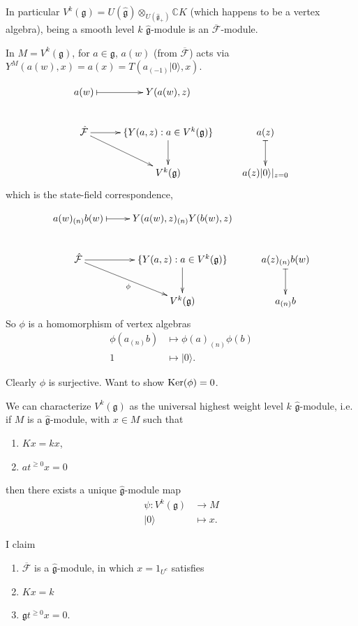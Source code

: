 \medskip\noindent
In particular
$V^k(\mathfrak{g})
=U(\hat{\mathfrak{g}})
\otimes_{U(\hat{\mathfrak{g}}_+)}\mathbb{C}K$
(which happens to be a vertex algebra),
being a smooth level $k$
$\hat{\mathfrak{g}}$-module is an
$\overline{\mathcal{F}}$-module.

In $M=V^k(\mathfrak{g})$, for $a \in
\mathfrak{g}$,
$a(w)$ (from $\overline{\mathcal{F}}$) acts
via
$Y^M(a(w),x)=a(x)=T(a_{(-1)}|0\rangle,x)$.

$$
\xymatrix{
a(w)\ar@{|->}[r]&Y(a(w),z)\\
\hat{\mathcal{F}}\ar[r]\ar[rd]& \{Y(a,z):a
\in V^k(\mathfrak{g})\}
\ar[d]
& a(z)\ar@{|->}[d]\\
&V^k(\mathfrak{g})&a(z)|0\rangle|_{z=0}
}
$$
which is the state-field correspondence,

$$
\xymatrix{
a(w)_{(n)}b(w)\ar@{|->}[r]&Y(a(w),z)_{(n)}
Y(b(w),z)\\
\hat{\mathcal{F}}\ar[r]\ar[rd]_\phi&
\{Y(a,z):a \in V^k(\mathfrak{g})\}
\ar[d]
& a(z)_{(n)}b(w)\ar@{|->}[d]\\
&V^k(\mathfrak{g})&a_{(n)}b
}
$$
So $\phi$ is a homomorphism of vertex
algebras
$$
\begin{aligned}
\phi(a_{(n)}b)&\mapsto \phi(a)_{(n)}\phi(b)\\
1 & \mapsto |0\rangle.
\end{aligned}
$$

\noindent
Clearly $\phi$ is surjective. Want to show
$\mathop{\mathrm{Ker}}(\phi)=0$.

\medskip\noindent
We can characterize $V^k(\mathfrak{g})$ as
the universal
highest weight level $k$
$\hat{\mathfrak{g}}$-module,
i.e. if $M$ is a $\hat{\mathfrak{g}}$-module,
with $x \in M$ such that
\begin{enumerate}
\item $Kx = kx$,
\item $at^{\geq 0}x=0$
\end{enumerate}

\noindent
then there exists a unique
$\hat{\mathfrak{g}}$-module map
$$
\begin{aligned}
\psi: V^k(\mathfrak{g}) &\longrightarrow M \\
|0\rangle &\longmapsto x.
\end{aligned}
$$

\begin{lemma}
\label{lemma-f-ghat-module}
I claim
\begin{enumerate}
\item $\overline{\mathcal{F}}$ is a
$\hat{\mathfrak{g}}$-module,
in which $x=1_{U^c}$ satisfies
\item $Kx=k$
\item $\mathfrak{g}t^{\geq 0}x=0$.
\end{enumerate}
\end{lemma}

